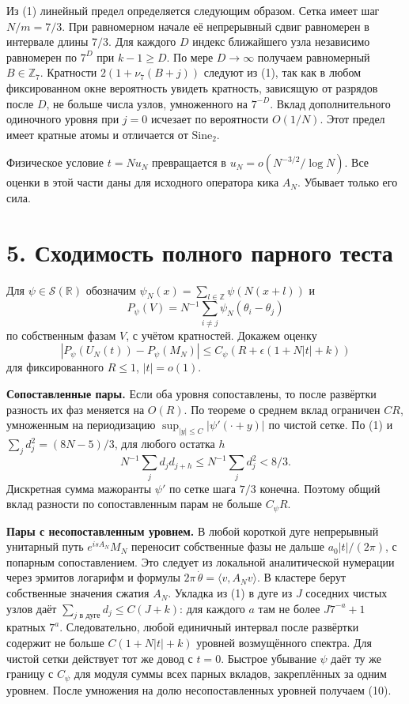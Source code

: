 \documentclass[11pt,a4paper]{article}
\newcommand{\R}{\mathbb R}
\newcommand{\Z}{\mathbb Z}
\newcommand{\si}{\mathrm{Sine}_2}
\newcommand{\sect}[1]{\section*{\sffamily\color{ink}#1}}
\newcommand{\subt}[1]{\par\medskip\noindent\textbf{#1.}\quad}
\begin{document}
Из (1) линейный предел определяется следующим образом. Сетка имеет шаг \(N/m=7/3\). При равномерном начале её непрерывный сдвиг равномерен в интервале длины \(7/3\). Для каждого \(D\) индекс ближайшего узла независимо равномерен по \(7^D\) при \(k-1\ge D\). По мере \(D\to\infty\) получаем равномерный \(B\in\mathbb Z_7\). Кратности \(2(1+\nu_7(B+j))\) следуют из (1), так как в любом фиксированном окне вероятность увидеть кратность, зависящую от разрядов после \(D\), не больше числа узлов, умноженного на \(7^{-D}\). Вклад дополнительного одиночного уровня при \(j=0\) исчезает по вероятности \(O(1/N)\). Этот предел имеет кратные атомы и отличается от \(\si\).

Физическое условие \(t=Nu_N\) превращается в \(u_N=o(N^{-3/2}/\log N)\). Все оценки в этой части даны для исходного оператора кика \(A_N\). Убывает только его сила.
\newpage
\sect{5. Сходимость полного парного теста}
Для \(\psi\in\mathcal S(\R)\) обозначим \(\psi_N(x)=\sum_{l\in\Z}\psi(N(x+l))\) и
\[
 P_\psi(V)=N^{-1}\sum_{i\ne j}\psi_N(\theta_i-\theta_j)
\]
по собственным фазам \(V\), с учётом кратностей. Докажем оценку
\begin{equation}
   |P_\psi(U_N(t))-P_\psi(M_N)|
                      \le C_\psi\left(R+\epsilon(1+N|t|+k)\right)
                                                             \tag{10}
\end{equation}
для фиксированного \(R\le1\), \(|t|=o(1)\).

\subt{Сопоставленные пары}
Если оба уровня сопоставлены, то после развёртки разность их фаз меняется на \(O(R)\). По теореме о среднем вклад ограничен \(C R\), умноженным на периодизацию \(\sup_{|y|\le C}|\psi'(\cdot+y)|\) по чистой сетке. По (1) и \(\sum_jd_j^2=(8N-5)/3\), для любого остатка \(h\)
\[
       N^{-1}\sum_j d_j d_{j+h}\le N^{-1}\sum_j d_j^2<8/3 .
\]
Дискретная сумма мажоранты \(\psi'\) по сетке шага \(7/3\) конечна. Поэтому общий вклад разности по сопоставленным парам не больше \(C_\psi R\).

\subt{Пары с несопоставленным уровнем}
В любой короткой дуге непрерывный унитарный путь \(e^{isA_N}M_N\) переносит собственные фазы не дальше \(a_0|t|/(2\pi)\), с попарным сопоставлением. Это следует из локальной аналитической нумерации через эрмитов логарифм и формулы \(2\pi\,\dot\theta=\langle v,A_Nv\rangle\). В кластере берут собственные значения сжатия \(A_N\). Укладка из (1) в дуге из \(J\) соседних чистых узлов даёт \(\sum_{j\text{ в дуге}}d_j\le C(J+k)\): для каждого \(a\) там не более \(J7^{-a}+1\) кратных \(7^a\). Следовательно, любой единичный интервал после развёртки содержит не больше \(C(1+N|t|+k)\) уровней возмущённого спектра. Для чистой сетки действует тот же довод с \(t=0\). Быстрое убывание \(\psi\) даёт ту же границу с \(C_\psi\) для модуля суммы всех парных вкладов, закреплённых за одним уровнем. После умножения на долю несопоставленных уровней получаем (10).
\end{document}
